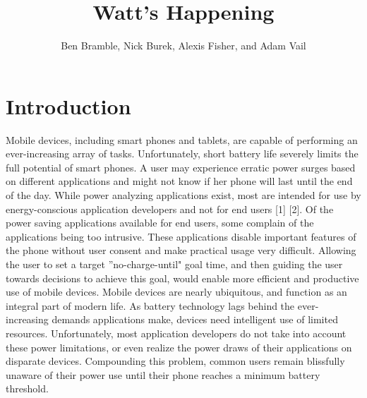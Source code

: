 \documentclass[11pt,twocolumn]{article}
\title{Watt's Happening}
\author{Ben Bramble, Nick Burek, Alexis Fisher, and Adam Vail}
\begin{document}
\maketitle

\section*{Introduction}
Mobile devices, including smart phones and tablets, are capable of performing an ever-increasing array of tasks. 
Unfortunately, short battery life severely limits the full potential of smart phones. 
A user may experience erratic power surges based on different applications and might not know if her phone will last until the end of the day. 
While power analyzing applications exist, most are intended for use by energy-conscious application developers and not for end users [1] [2]. 
Of the power saving applications available for end users, some complain of the applications being too intrusive. 
These applications disable important features of the phone without user consent and make practical usage very difficult. 
Allowing the user to set a target ''no-charge-until" goal time, and then guiding the user towards decisions to achieve this goal, would enable more efficient and productive use of mobile devices.
Mobile devices are nearly ubiquitous, and function as an integral part of modern life. 
As battery technology lags behind the ever-increasing demands applications make, devices need intelligent use of limited resources. 
Unfortunately, most application developers do not take into account these power limitations, or even realize the power draws of their applications on disparate devices. 
Compounding this problem, common users remain blissfully unaware of their power use until their phone reaches a minimum battery threshold.
\end{document}
